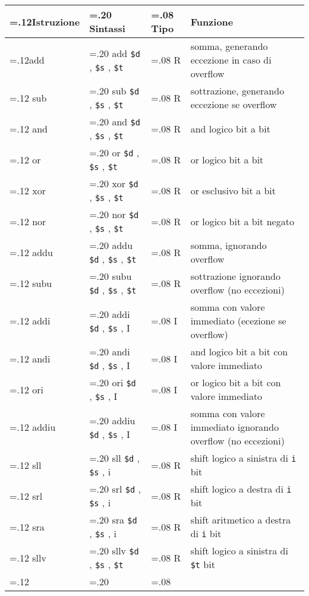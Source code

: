 \documentclass{standalone}
\newcommand\lightrule{%
	\arrayrulecolor{black!30}%
	\midrule[\lightrulewidth]%
	\arrayrulecolor{black}}
\newcommand\register[1]{%
	\texttt{#1}%
}
\begin{document}
\begin{tabularx}{\textwidth}{ >{\hsize=.12\textwidth}X >{\hsize=.20\textwidth}X >{\hsize=.08\textwidth}X X }
	\toprule
		Istruzione & Sintassi & Tipo & Funzione \\
	\midrule
		add & add \register{\$d}, \register{\$s}, \register{\$t} & R & somma, generando eccezione in caso di overflow \\\lightrule
		sub & sub \register{\$d}, \register{\$s}, \register{\$t} & R & sottrazione, generando eccezione se overflow \\\lightrule
		and & and \register{\$d}, \register{\$s}, \register{\$t} & R & and logico bit a bit \\\lightrule
		or & or \register{\$d}, \register{\$s}, \register{\$t} & R & or logico bit a bit \\\lightrule
		xor & xor \register{\$d}, \register{\$s}, \register{\$t} & R & or esclusivo bit a bit \\\lightrule
		nor & nor \register{\$d}, \register{\$s}, \register{\$t} & R & or logico bit a bit negato \\\lightrule
		addu & addu \register{\$d}, \register{\$s}, \register{\$t} & R & somma, ignorando overflow \\\lightrule
		subu & subu \register{\$d}, \register{\$s}, \register{\$t} & R & sottrazione ignorando overflow (no eccezioni) \\\lightrule
		addi & addi \register{\$d}, \register{\$s}, I & I & somma con valore immediato (ecezione se overflow) \\\lightrule
		andi & andi \register{\$d}, \register{\$s}, I & I & and logico bit a bit con valore immediato \\\lightrule
		ori & ori \register{\$d}, \register{\$s}, I & I & or logico bit a bit con valore immediato \\\lightrule
		addiu &  addiu \register{\$d}, \register{\$s}, I & I & somma con valore immediato ignorando overflow (no eccezioni) \\\lightrule
		sll & sll \register{\$d}, \register{\$s}, i & R & shift logico a sinistra di \register{i} bit \\\lightrule
		srl & srl \register{\$d}, \register{\$s}, i & R & shift logico a destra di \register{i} bit \\\lightrule
		sra & sra \register{\$d}, \register{\$s}, i & R & shift aritmetico a destra di \register{i} bit \\\lightrule
		sllv & sllv \register{\$d}, \register{\$s}, \register{\$t} & R & shift logico a sinistra di \register{\$t} bit \\\lightrule

\end{tabularx}
\end{document}
